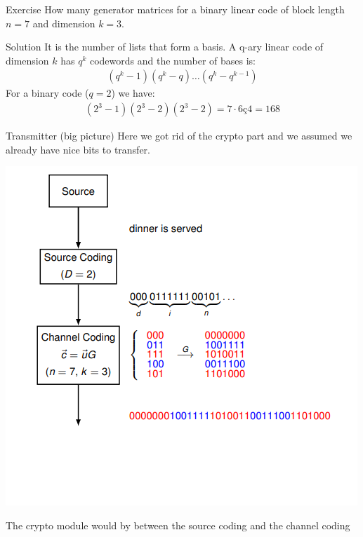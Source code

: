 \begin{parag}{Exercise}
    How many generator matrices for a binary linear code of block length $n = 7$ and dimension $k =  3$.
    \begin{subparag}{Solution}
        It is the number of lists that form a basis. A q-ary linear code of dimension $k$ has $q^k$ codewords and the number of bases is:
        \begin{align*} \left(q^k - 1\right)\left(q^k-q\right)\ldots\left(q^k-q^{k-1}\right) \end{align*}
        For a binary code  ($q= 2$) we have:
        \begin{align*} \left(2^3 - 1\right)\left(2^3 - 2\right)\left(2^3 - 2\right) = 7 \cdot  6 ç 4 = 168 \end{align*}
    \end{subparag}
\end{parag}
\begin{parag}{Transmitter (big picture)}
    Here we got rid of the crypto part and we assumed we already have nice bits to transfer.
    \begin{center}
        \includegraphics[scale=0.6]{22025-05-13.png}
    \end{center}
    \begin{framedremark}
        The crypto module would by between the source coding and the channel coding
    \end{framedremark}
\end{parag}


